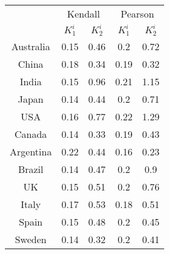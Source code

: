 
\begin{tabular}{ |c|c|c|c|c| }
\hline
& \multicolumn{2}{|c|}{Kendall} & \multicolumn{2}{|c|}{Pearson} \\
\cline{2-5}
\raisebox{1.5ex}{Markets} & $K_1^i$ & $K_2^i$ & $K_1^i$ & $K_2^i$ \\
\hline
    Australia & 0.15 & 0.46 & 0.2 & 0.72 \\ 
 \hline 
China & 0.18 & 0.34 & 0.19 & 0.32 \\ 
 \hline 
India & 0.15 & 0.96 & 0.21 & 1.15 \\ 
 \hline 
Japan & 0.14 & 0.44 & 0.2 & 0.71 \\ 
 \hline 
USA & 0.16 & 0.77 & 0.22 & 1.29 \\ 
 \hline 
Canada & 0.14 & 0.33 & 0.19 & 0.43 \\ 
 \hline 
Argentina & 0.22 & 0.44 & 0.16 & 0.23 \\ 
 \hline 
Brazil & 0.14 & 0.47 & 0.2 & 0.9 \\ 
 \hline 
UK & 0.15 & 0.51 & 0.2 & 0.76 \\ 
 \hline 
Italy & 0.17 & 0.53 & 0.18 & 0.51 \\ 
 \hline 
Spain & 0.15 & 0.48 & 0.2 & 0.45 \\ 
 \hline 
Sweden & 0.14 & 0.32 & 0.2 & 0.41 \\ 
 \hline 
\end{tabular}